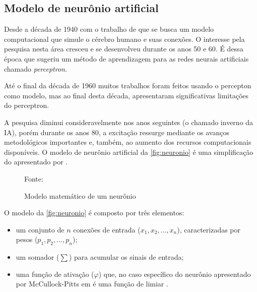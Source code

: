 \subsection{Modelo de neurônio artificial}\label{perceptron}
Desde a década de 1940 com o trabalho de  que se busca um modelo computacional que simule o cérebro humano e suas conexões. O interesse pela pesquisa nesta área cresceu e se desenvolveu durante os anos 50 e 60. É dessa época que  sugeriu um método de aprendizagem para as redes neurais artificiais chamado \textit{perceptron}. 

Até o final da década de 1960 muitos trabalhos foram feitos usando o percepton como modelo, mas ao final desta década,  apresentaram significativas limitações do perceptron. 

A pesquisa diminui consideravelmente nos anos seguintes (o chamado inverno da IA), porém durante  os  anos  80,  a excitação	ressurge mediante os avanços metodológicos importantes e, também, ao aumento dos recursos computacionais disponíveis. O  modelo  de  neurônio  artificial  da \autoref{fig:neuronio} é uma simplificação do apresentado por .

\begin{figure}[h!]
	\centering
	\caption{Modelo matemático de um neurônio}
	
	{\scriptsize 	Fonte: }	
	\label{fig:neuronio}
\end{figure}

O modelo da \autoref{fig:neuronio} é composto por três elementos:

\begin{itemize}
	\item  um conjunto de $ n $ conexões de entrada ($ x_1, x_2, \dots , x_n $), caracterizadas por pesos ($ p_1, p_2, \dots, p_n $);
	\item um somador ($ \sum $) para acumular os sinais de entrada;
	\item uma função de ativação ($\varphi$) que, no caso específico do neurônio apresentado por McCullock-Pitts em  é uma função de limiar \cite{ferneda_redes_2006} \cite{lima_ia_2016}.
\end{itemize}

